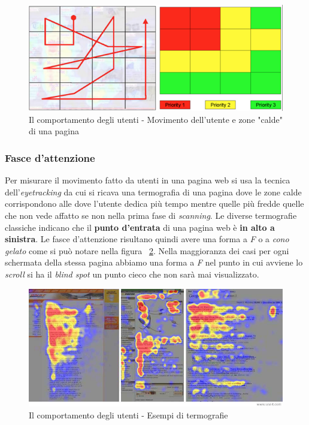		\begin{figure} [h]
				\centering
				\includegraphics[width=\textwidth]{images/IlComportamentoDegliUtenti-FasceDAttenzione2}
				\caption[Il comportamento degli utenti - Movimento utente e zone calde pagina]{Il comportamento degli utenti - Movimento dell'utente e zone "calde" di una pagina}
				\label{fig:FasceDAttenzione2}
		\end{figure}
		
		\subsubsection{Fasce d'attenzione}
		
			Per misurare il movimento fatto da utenti in una pagina web si usa la tecnica dell'\emph{eyetracking} da cui si ricava una termografia di una pagina dove le zone calde corrispondono alle dove l'utente dedica più tempo mentre quelle più fredde quelle che non vede affatto se non nella prima fase di \emph{scanning}. Le diverse termografie classiche indicano che il \textbf{punto d'entrata} di una pagina web è \textbf{in alto a sinistra}. Le fasce d'attenzione risultano quindi avere una forma a \emph{F} o a \emph{cono gelato} come si può notare nella figura ~\ref{fig:FasceDAttenzione}.
			Nella maggioranza dei casi per ogni schermata della stessa pagina abbiamo una forma a \emph{F} nel punto in cui avviene lo \emph{scroll} si ha il \emph{blind spot} un punto cieco che non sarà mai visualizzato.
			
			\begin{figure} [h]
				\centering
				\includegraphics[trim={0 1pt 0 0}, width=\textwidth]{images/IlComportamentoDegliUtenti-FasceDAttenzione}
				\caption[Il comportamento degli utenti - Termografie]{Il comportamento degli utenti - Esempi di termografie}
				\label{fig:FasceDAttenzione}
			\end{figure}
		

